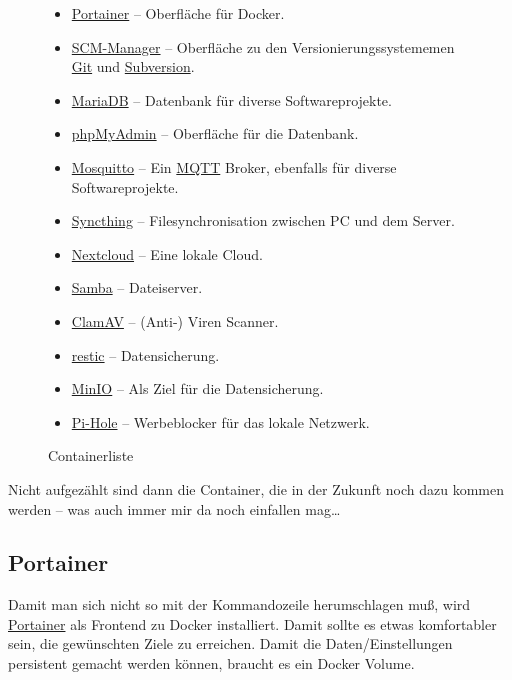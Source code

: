 \documentclass[12pt,a4paper]{article}
\begin{document}
\begin{figure}[H]
\begin{itemize}
\item \href{https://www.portainer.io/}{Portainer} -- Oberfläche für Docker.
\item \href{https://www.scm-manager.org/}{SCM-Manager} -- Oberfläche zu den Versionierungssystememen \href{https://git-scm.com/}{Git}
und \href{https://subversion.apache.org/}{Subversion}.
\item \href{https://mariadb.org/}{MariaDB} -- Datenbank für diverse Softwareprojekte.
\item \href{https://www.phpmyadmin.net/}{phpMyAdmin} -- Oberfläche für die Datenbank.
\item \href{https://mosquitto.org/}{Mosquitto} -- Ein \href{https://mqtt.org/}{MQTT} Broker, ebenfalls für diverse
Softwareprojekte.
\item \href{https://syncthing.net/}{Syncthing} -- Filesynchronisation zwischen PC und dem Server.
\item \href{https://nextcloud.com/}{Nextcloud} -- Eine lokale Cloud.

\item \href{https://www.samba.org/}{Samba} -- Dateiserver.
\item \href{https://www.clamav.net/}{ClamAV} -- (Anti-) Viren Scanner.
\item \href{https://restic.net/}{restic} -- Datensicherung.
\item \href{https://docs.min.io/}{MinIO} -- Als Ziel für die Datensicherung.
\item \href{https://pi-hole.net/}{Pi-Hole} -- Werbeblocker für das lokale Netzwerk.
\end{itemize}
\caption{Containerliste}\label{fig:Containerliste}
\end{figure}

Nicht aufgezählt sind dann die Container, die in der Zukunft noch dazu kommen werden -- was auch immer mir da noch
einfallen mag\ldots

\subsection{Portainer}\label{sub:Portainer}
Damit man sich nicht so mit der Kommandozeile herumschlagen muß, wird \href{https://hub.docker.com/r/portainer/portainer/}{Portainer}
als Frontend zu Docker installiert. Damit sollte es etwas komfortabler sein, die gewünschten Ziele zu erreichen. Damit
die Daten/Einstellungen persistent gemacht werden können, braucht es ein Docker Volume.
\end{document}
